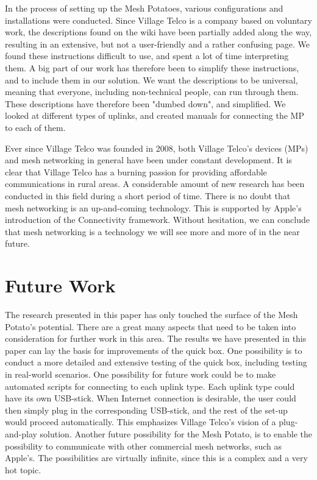In the process of setting up the Mesh Potatoes, various configurations and installations were conducted. Since Village Telco is a company based on voluntary work, the descriptions found on the wiki have been partially added along the way, resulting in an extensive, but not a user-friendly and a rather confusing page. We found these instructions difficult to use, and spent a lot of time interpreting them. A big part of our work has therefore been to simplify these instructions, and to include them in our solution. We want the descriptions to be universal, meaning that everyone, including non-technical people, can run through them. These descriptions have therefore been "dumbed down", and simplified. We looked at different types of uplinks, and created manuals for connecting the MP to each of them. 

Ever since Village Telco was founded in 2008, both Village Telco's devices (MPs) and mesh networking in general have been under constant development. It is clear that Village Telco has a burning passion for providing affordable communications in rural areas. A considerable amount of new research has been conducted in this field during a short period of time. There is no doubt that mesh networking is an up-and-coming technology. This is supported by Apple's introduction of the Connectivity framework. Without hesitation, we can conclude that mesh networking is a technology we will see more and more of in the near future.  

\section{Future Work}
The research presented in this paper has only touched the surface of the Mesh Potato's potential. There are a great many aspects that need to be taken into consideration for further work in this area. The results we have presented in this paper can lay the basis for improvements of the \gls{quick} box. One possibility is to conduct a more detailed and extensive testing of the \gls{quick} box, including testing in real-world scenarios. One possibility for future work could be to make automated scripts for connecting to each uplink type. Each uplink type could have its own USB-stick. When Internet connection is desirable, the user could then simply plug in the corresponding USB-stick, and the rest of the set-up would proceed automatically. This emphasizes Village Telco's vision of a plug-and-play solution. Another future possibility for the Mesh Potato, is to enable the possibility to communicate with other commercial mesh networks, such as Apple's. The possibilities are virtually infinite, since this is a complex and a very hot topic.

